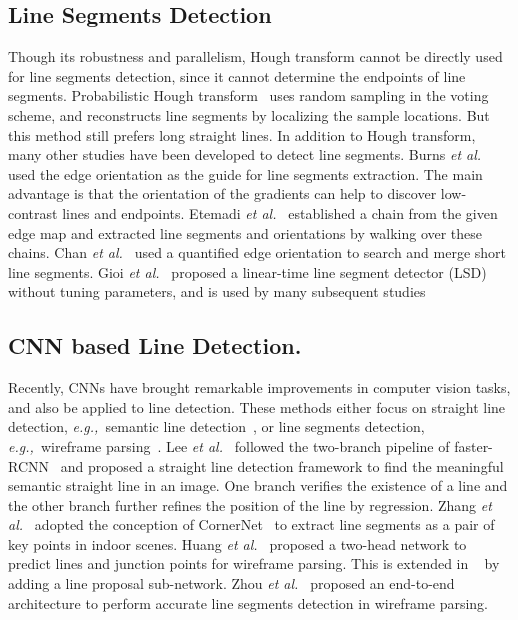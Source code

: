 \documentclass[10pt,journal,cspaper,compsoc]{IEEEtran}
\def\etal{\emph{et al.~}}
\def\eg{\emph{e.g.,~}}
\begin{document}
\subsection{Line Segments Detection}
Though its robustness and parallelism, Hough transform cannot be directly used for line segments detection,
since it cannot determine the endpoints of line segments.
%
Probabilistic Hough transform~\cite{kiryati1991probabilistic} uses random sampling in the voting scheme,
and reconstructs line segments by localizing the sample locations.
%
But this method still prefers long straight lines.
%
In addition to Hough transform, many other studies have been developed to detect line segments.
%
Burns \etal \cite{burns1986extracting} used the edge orientation as the guide for line segments extraction.
%
The main advantage is that the orientation of the gradients can help to discover low-contrast lines
and endpoints.
%
Etemadi \etal \cite{etemadi1992robust} established a chain from the given edge map and
extracted line segments and orientations by walking over these chains.
Chan \etal \cite{chan1996line} used a quantified edge orientation to search and merge short line segments.
%
Gioi \etal \cite{von2008lsd} proposed a linear-time line segment detector (LSD) without tuning parameters,
and is used by many subsequent studies~\cite{akinlar2011edlines,akinlar2013edcircles,feng2013automatic}


\subsection{CNN based Line Detection.}
% 
Recently, CNNs have brought remarkable improvements in computer vision tasks, and also be applied to line detection.
%
These methods either focus on straight line detection, \eg semantic line detection~\cite{lee2017semantic,ahmad2017comparison}, or line segments detection, 
\eg wireframe parsing~\cite{zhang2019ppgnet,huang2018learning,zhou2019end,xue2020holistically}.
%
Lee \etal \cite{lee2017semantic} followed the two-branch pipeline of faster-RCNN~\cite{ren2015faster}
and proposed a straight line detection framework to find the meaningful semantic straight line in an image. 
%
One branch verifies the existence of a line and the other branch further refines the position of the line
by regression.
%
Zhang \etal \cite{zhang2019ppgnet} adopted the conception of CornerNet~\cite{law2018cornernet} 
to extract line segments as a pair of key points in indoor scenes.
%
Huang \etal \cite{huang2018learning} proposed a two-head network to predict lines and junction points for wireframe parsing.
%
This is extended in ~\cite{zhou2019end} by adding a line proposal sub-network.
%
Zhou \etal \cite{zhou2019end} proposed an end-to-end architecture to perform accurate line segments detection in wireframe parsing. 
\end{document}
